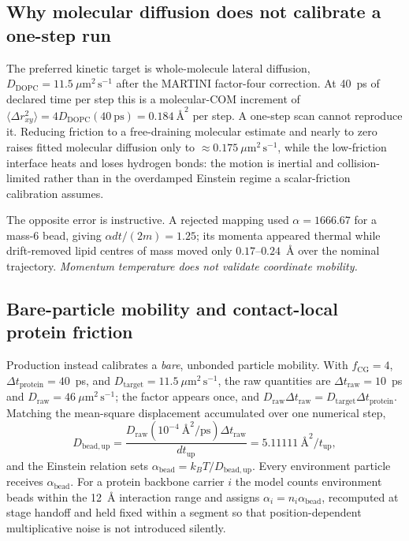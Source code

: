 \documentclass[journal=jctcce,manuscript=article,layout=twocolumn]{achemso}
\begin{document}
\subsection{Why molecular diffusion does not calibrate a one-step run}
\label{sec:designspace}

The preferred kinetic target is whole-molecule lateral diffusion,
$D_\mathrm{DOPC}=11.5~\mu\mathrm{m}^2\,\mathrm{s}^{-1}$ after the MARTINI
factor-four correction. At 40~ps of declared time per step this is a
molecular-COM increment of
$\langle \Delta r_{xy}^{2}\rangle = 4D_\mathrm{DOPC}(40~\mathrm{ps})=0.184~\text{\AA}^2$
per step. A one-step scan cannot reproduce it. Reducing friction to a free-draining
molecular estimate and nearly to zero raises fitted molecular diffusion only to
$\approx0.175~\mu\mathrm{m}^2\,\mathrm{s}^{-1}$, while the low-friction interface
heats and loses hydrogen bonds: the motion is inertial and collision-limited rather
than in the overdamped Einstein regime a scalar-friction calibration assumes.

The opposite error is instructive. A rejected mapping used $\alpha=1666.67$ for a
mass-6 bead, giving $\alpha dt/(2m)=1.25$; its momenta appeared thermal while
drift-removed lipid centres of mass moved only $0.17$--$0.24$~\AA{} over the nominal
trajectory. \emph{Momentum temperature does not validate coordinate mobility.}

\subsection{Bare-particle mobility and contact-local protein friction}
\label{sec:timescale}

Production instead calibrates a \emph{bare}, unbonded particle mobility. With
$f_\mathrm{CG}=4$, $\Delta t_\mathrm{protein}=40$~ps, and
$D_\mathrm{target}=11.5~\mu\mathrm{m}^2\,\mathrm{s}^{-1}$, the raw quantities are
$\Delta t_\mathrm{raw}=10$~ps and
$D_\mathrm{raw}=46~\mu\mathrm{m}^2\,\mathrm{s}^{-1}$; the factor appears once, and
$D_\mathrm{raw}\Delta t_\mathrm{raw}=D_\mathrm{target}\Delta t_\mathrm{protein}$.
Matching the mean-square displacement accumulated over one numerical step,
\begin{equation}
  D_\mathrm{bead,up}
  =\frac{D_\mathrm{raw}(10^{-4}~\text{\AA}^2/\mathrm{ps})\Delta t_\mathrm{raw}}
  {dt_\mathrm{up}} = 5.11111~\text{\AA}^2/t_\mathrm{up},
  \label{eq:bead_diffusion}
\end{equation}
and the Einstein relation sets $\alpha_\mathrm{bead}=k_BT/D_\mathrm{bead,up}$. Every
environment particle receives $\alpha_\mathrm{bead}$. For a protein backbone carrier
$i$ the model counts environment beads within the 12~\AA{} interaction range and
assigns $\alpha_i=n_i\alpha_\mathrm{bead}$, recomputed at stage handoff and held
fixed within a segment so that position-dependent multiplicative noise is not
introduced silently.
\end{document}
